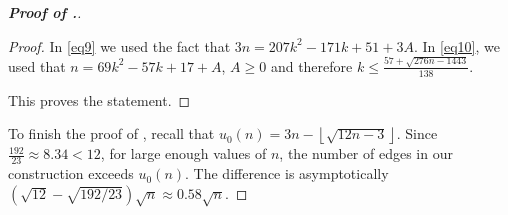 \documentclass[10pt,a4paper]{amsart}
\begin{document}
\begin{proof}[\bf Proof of .]
\begin{proof}
In \eqref{eq9} we used the fact that $3n=207k^2-171k+51+3A$. In \eqref{eq10}, we used that $n=69k^2-57k+17+A$, $A \geq 0$ and therefore
$k \leq \frac{57 + \sqrt{276n - 1443}}{138}.$

This proves the statement.
\end{proof}

To finish the proof of , recall that $u_0(n) = 3n-\left\lfloor\sqrt{12n - 3}\right\rfloor$. Since $\frac{192}{23} \approx 8.34 < 12$, for large enough values of $n$, the number of edges in our construction exceeds $u_0(n)$. The difference is asymptotically $\left(\sqrt{12} - \sqrt{192/23}\right)\sqrt{n} \approx 0.58\sqrt{n}$.
\end{proof}
\end{document}
